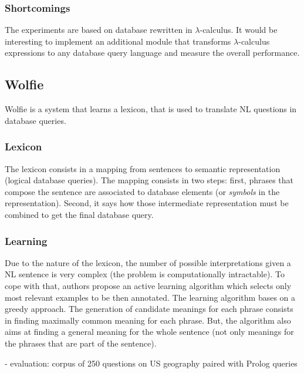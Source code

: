 \documentclass[10pt,journal,letterpaper,compsoc]{IEEEtran}
\begin{document}
\subsubsection{Shortcomings}
The experiments are based on database rewritten in $\lambda$-calculus. It would
be interesting to implement an additional module that transforms
$\lambda$-calculus expressions to any database query language and measure the
overall performance. 











\subsection{{\sc Wolfie}~\cite{Thompson:2003:AWM:1622420.1622421}}
\label{sec:wolfie}
{\sc Wolfie} is a system that learns a lexicon, that is used to translate NL
questions in database queries.

\subsubsection{Lexicon} 
The lexicon consists in a mapping from sentences to semantic representation
(logical database queries).
The mapping consists in two steps: first, phrases that compose the sentence 
are associated to database elements (or {\it symbols} in the representation).
Second, it says how those intermediate representation must be combined to get
the final database query. 



\subsubsection{Learning}
Due to the nature of the lexicon, the number of possible interpretations given a
NL sentence is very complex (the problem is computationally intractable).
To cope with that, authors propose an active learning algorithm which selects 
only most relevant examples to be then annotated.
The learning algorithm bases on a greedy approach. The generation of candidate
meanings for each phrase consists in finding maximally common meaning for each
phrase.
But, the algorithm also aims at finding a general meaning for the whole sentence
(not only meanings for the phrases that are part of the sentence).

- evaluation: corpus of 250 questions on US geography paired with Prolog queries
\end{document}
